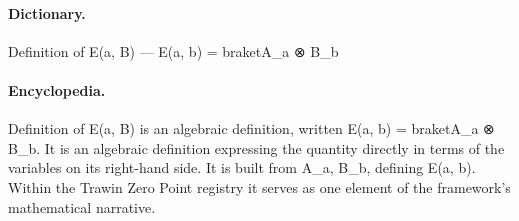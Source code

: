 \paragraph{Dictionary.}
Definition of E(a, B) — E(a, b) = braketA\_a ⊗ B\_b

\paragraph{Encyclopedia.}
Definition of E(a, B) is an algebraic definition, written E(a, b) = braketA\_a ⊗ B\_b. It is an algebraic definition expressing the quantity directly in terms of the variables on its right-hand side. It is built from A\_a, B\_b, defining E(a, b). Within the Trawin Zero Point registry it serves as one element of the framework's mathematical narrative.
